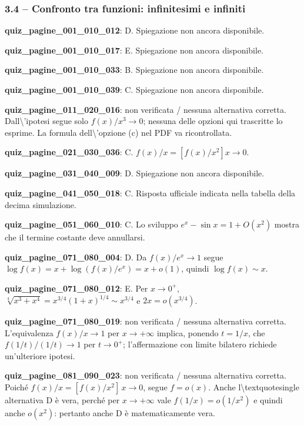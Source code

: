 \documentclass[11pt,a4paper]{article}
\newcounter{quiz}
\begin{document}
\subsubsection*{3.4 -- Confronto tra funzioni: infinitesimi e infiniti}
\noindent\textbf{quiz\_pagine\_001\_010\_012}: D. Spiegazione non ancora disponibile.\par\medskip
\noindent\textbf{quiz\_pagine\_001\_010\_017}: E. Spiegazione non ancora disponibile.\par\medskip
\noindent\textbf{quiz\_pagine\_001\_010\_033}: B. Spiegazione non ancora disponibile.\par\medskip
\noindent\textbf{quiz\_pagine\_001\_010\_039}: C. Spiegazione non ancora disponibile.\par\medskip
\noindent\textbf{quiz\_pagine\_011\_020\_016}: non verificata / nessuna alternativa corretta. Dall\textbackslash{}'ipotesi segue solo $f(x)/x^3\to0$; nessuna delle opzioni qui trascritte lo esprime. La formula dell\textbackslash{}'opzione (c) nel PDF va ricontrollata.\par\medskip
\noindent\textbf{quiz\_pagine\_021\_030\_036}: C. $f(x)/x=[f(x)/x^2]x\to0$.\par\medskip
\noindent\textbf{quiz\_pagine\_031\_040\_009}: D. Spiegazione non ancora disponibile.\par\medskip
\noindent\textbf{quiz\_pagine\_041\_050\_018}: C. Risposta ufficiale indicata nella tabella della decima simulazione.\par\medskip
\noindent\textbf{quiz\_pagine\_051\_060\_010}: C. Lo sviluppo $e^x-\sin x=1+O(x^2)$ mostra che il termine costante deve annullarsi.\par\medskip
\noindent\textbf{quiz\_pagine\_071\_080\_004}: D. Da $f(x)/e^x\to1$ segue $\log f(x)=x+\log(f(x)/e^x)=x+o(1)$, quindi $\log f(x)\sim x$.\par\medskip
\noindent\textbf{quiz\_pagine\_071\_080\_012}: E. Per $x\to0^+$, $\sqrt[4]{x^3+x^4}=x^{3/4}(1+x)^{1/4}\sim x^{3/4}$ e $2x=o(x^{3/4})$.\par\medskip
\noindent\textbf{quiz\_pagine\_071\_080\_019}: non verificata / nessuna alternativa corretta. L'equivalenza $f(x)/x\to1$ per $x\to+\infty$ implica, ponendo $t=1/x$, che $f(1/t)/(1/t)\to1$ per $t\to0^+$; l'affermazione con limite bilatero richiede un'ulteriore ipotesi.\par\medskip
\noindent\textbf{quiz\_pagine\_081\_090\_023}: non verificata / nessuna alternativa corretta. Poiché $f(x)/x=[f(x)/x^2]\,x\to0$, segue $f=o(x)$. Anche l\textbackslash{}textquotesingle alternativa D è vera, perché per $x\to+\infty$ vale $f(1/x)=o(1/x^2)$ e quindi anche $o(x^2)$: pertanto anche D è matematicamente vera.\par\medskip
\end{document}
